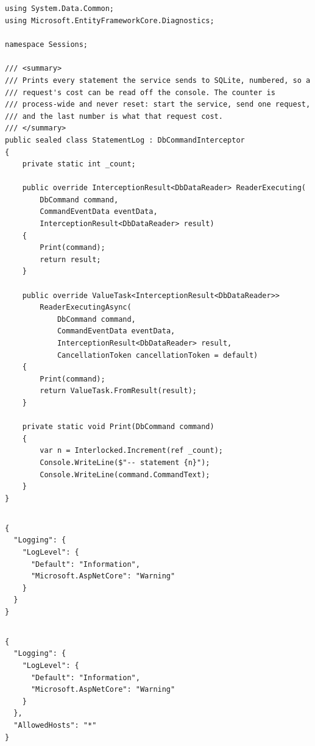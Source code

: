 \subsection*{}
\begin{verbatim}
using System.Data.Common;
using Microsoft.EntityFrameworkCore.Diagnostics;

namespace Sessions;

/// <summary>
/// Prints every statement the service sends to SQLite, numbered, so a
/// request's cost can be read off the console. The counter is
/// process-wide and never reset: start the service, send one request,
/// and the last number is what that request cost.
/// </summary>
public sealed class StatementLog : DbCommandInterceptor
{
    private static int _count;

    public override InterceptionResult<DbDataReader> ReaderExecuting(
        DbCommand command,
        CommandEventData eventData,
        InterceptionResult<DbDataReader> result)
    {
        Print(command);
        return result;
    }

    public override ValueTask<InterceptionResult<DbDataReader>>
        ReaderExecutingAsync(
            DbCommand command,
            CommandEventData eventData,
            InterceptionResult<DbDataReader> result,
            CancellationToken cancellationToken = default)
    {
        Print(command);
        return ValueTask.FromResult(result);
    }

    private static void Print(DbCommand command)
    {
        var n = Interlocked.Increment(ref _count);
        Console.WriteLine($"-- statement {n}");
        Console.WriteLine(command.CommandText);
    }
}
\end{verbatim}

\subsection*{}
\begin{verbatim}
{
  "Logging": {
    "LogLevel": {
      "Default": "Information",
      "Microsoft.AspNetCore": "Warning"
    }
  }
}
\end{verbatim}

\subsection*{}
\begin{verbatim}
{
  "Logging": {
    "LogLevel": {
      "Default": "Information",
      "Microsoft.AspNetCore": "Warning"
    }
  },
  "AllowedHosts": "*"
}
\end{verbatim}
